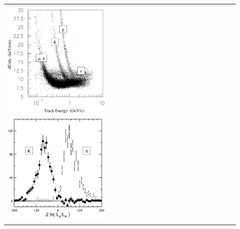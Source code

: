 \begin{slide*}
\begin{minipage}[t]{\linewidth}
\begin{tabular}{p{0.45\linewidth} c p{0.5\linewidth}}
  \begin{minipage}{\linewidth}
    \begin{itemize}
      \item \begin{minipage}{\linewidth}
              {\large Energy loss in the drift chamber:} \\
	      \includegraphics[height=6 cm]{dedx.eps}
	    \end{minipage}
    \end{itemize}
  \end{minipage} & &
  \begin{minipage}{\linewidth}
    \begin{itemize}
      \item \begin{minipage}{\linewidth}
	      {\large Ring-Imaging \v{C}erenkov Detector:} \\
	      \includegraphics[height=6 cm]{rich_kpisep2.eps}
	    \end{minipage}
    \end{itemize}
  \end{minipage} \\
  \begin{minipage}{\linewidth}
    \begin{itemize}

\end{itemize}
\end{minipage}
\end{tabular}
\end{minipage}
\end{slide*}
